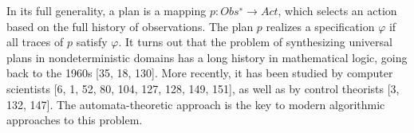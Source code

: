 

In its full generality, a plan is a mapping $p : Obs^∗ \rightarrow Act$, which selects an action based on the full history of observations. The plan $p$ realizes a specification $\varphi$  if all traces of $p$ satisfy $\varphi$. 
It turns out that the problem of synthesizing universal plans in nondeterministic domains has a long history in mathematical logic, going back to the 1960s [35, 18, 130]. More recently, it has been studied by computer scientists [6, 1, 52, 80, 104, 127, 128, 149, 151], as well as by control theorists [3, 132, 147]. The automata-theoretic approach is the key to modern algorithmic approaches to this problem. 










